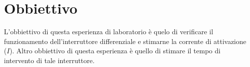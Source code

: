 \section*{Obbiettivo}

L'obbiettivo di questa esperienza di laboratorio è quelo di verificare il funzionamento dell'interruttore differenziale e stimarne la corrente di attivazione ($I$). Altro obbiettivo di questa esperienza è quello di stimare il tempo di intervento di tale interruttore.
